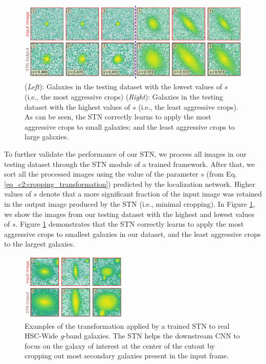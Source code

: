 \begin{figure}[htb]
    \centering
    \includegraphics[width
    =\textwidth]{most_least_crops.png}
    \caption{(\textit{Left}): Galaxies in the testing dataset with the lowest values of $s$ (i.e., the most aggressive crops) (\textit{Right}): Galaxies in the testing dataset with the highest values of $s$ (i.e., the least aggressive crops). As can be seen, the STN correctly learns to apply the most aggressive crops to small galaxies; and the least aggressive crops to large galaxies.}
    \label{fig_c2:most_least_crops}
\end{figure}

To further validate the performance of our STN, we process all images in our testing dataset through the STN module of a trained \gampen{} framework. After that, we sort all the processed images using the value of the parameter $s$ (from Eq. \ref{eq_c2:cropping_transformation}) predicted by the localization network. Higher values of $s$ denote that a more significant fraction of the input image was retained in the output image produced by the STN  (i.e., minimal cropping). In Figure \ref{fig_c2:most_least_crops}, we show the images from our testing dataset with the highest and lowest values of $s$. Figure \ref{fig_c2:most_least_crops} demonstrates that the STN correctly learns to apply the most aggressive crops to smallest galaxies in our dataset, and the least aggressive crops to the largest galaxies.

\begin{figure}[htb]
    \centering
    \includegraphics[width
    =0.45\textwidth]{real_galaxies_stn.png}
    \caption{Examples of the transformation applied by a trained STN to real HSC-Wide \textit{g}-band galaxies. The STN helps the downstream CNN to focus on the galaxy of interest at the center of the cutout by cropping out most secondary galaxies present in the input frame.}
    \label{fig_c2:real_galaxies_stn}
\end{figure}

